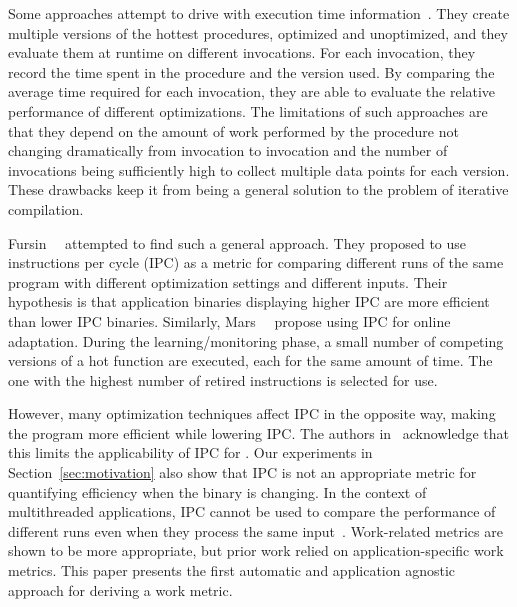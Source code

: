 Some approaches attempt to drive \itercomp with execution time information~\cite{fursin:hal-01257279,fursin:inria-00001054,tiwari2011online}. They create
multiple versions of the hottest procedures, optimized and unoptimized, and they evaluate them at runtime on different invocations.
For each invocation, they record the time spent in the procedure and the version used. By comparing the average time required for each
invocation, they are able to evaluate the relative performance of different optimizations. The limitations of such approaches are that they
depend on the amount of work performed by the procedure not changing dramatically from invocation to invocation and the number of
invocations being sufficiently high to collect multiple data points for each version. These drawbacks keep it from being a general solution
to the problem of iterative compilation.

Fursin~\etal~\cite{fursin07} attempted to find such a general approach. They proposed to use instructions per cycle (IPC)
as a metric for comparing different runs of the same program with different optimization settings and different inputs. Their hypothesis is
that application binaries displaying higher IPC are more efficient than lower IPC binaries. Similarly, Mars~\etal~\cite{Mars:2009:SBO:1545006.1545068}
propose using IPC for online adaptation. During the learning/monitoring phase, a small number of competing versions of a hot function are executed, each
for the same amount of time. The one with the highest number of retired instructions is selected for use. 

However, many optimization techniques affect
IPC in the opposite way, making the program more efficient while lowering IPC. The authors in~\cite{fursin07} acknowledge that this limits
the applicability of IPC for \itercomp. Our experiments in Section~\ref{sec:motivation} also show that IPC is not an appropriate metric
for quantifying efficiency when the binary is changing. In the context of multithreaded applications, IPC cannot be used to compare the performance of
different runs even when they process the same input~\cite{alameldeen06,eyerman08}. Work-related metrics are shown to be more appropriate, but prior work
relied on application-specific work metrics. This paper presents the first automatic and application agnostic approach for deriving a work metric.


